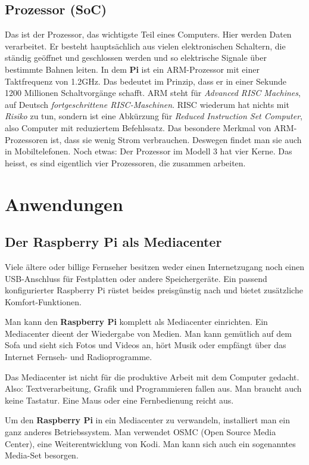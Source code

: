 \documentclass[12pt,a4paper]{article}
\newcommand{\rp}{\textbf{Raspberry Pi}\xspace}
\begin{document}
\subsection{Prozessor (SoC)}

Das ist der Prozessor, das wichtigste Teil eines Computers. Hier werden Daten verarbeitet. Er besteht hauptsächlich aus vielen elektronischen Schaltern, die ständig geöffnet und geschlossen werden und so elektrische Signale über bestimmte Bahnen leiten. In dem \textbf{Pi} ist ein ARM-Prozessor mit einer Taktfrequenz von 1.2GHz. Das bedeutet im Prinzip, dass er in einer Sekunde 1200 Millionen Schaltvorgänge schafft. ARM steht für \textit{Advanced RISC Machines}, auf Deutsch \textit{fortgeschrittene RISC-Maschinen}. RISC wiederum hat nichts mit \textit{Risiko} zu tun, sondern ist eine Abkürzung für \textit{Reduced Instruction Set Computer}, also Computer mit reduziertem Befehlssatz. Das besondere Merkmal von ARM-Prozessoren ist, dass sie wenig Strom verbrauchen. Deswegen findet man sie auch in Mobiltelefonen. Noch etwas: Der Prozessor im Modell 3 hat vier Kerne. Das heisst, es sind eigentlich vier Prozessoren, die zusammen arbeiten.  

\section{Anwendungen}

\subsection{Der \rp als Mediacenter}

Viele ältere oder billige Fernseher besitzen weder einen Internetzugang noch einen USB-Anschluss für Festplatten oder andere Speichergeräte. Ein passend konfigurierter Raspberry Pi rüstet beides preisgünstig nach und bietet zusätzliche Komfort-Funktionen.

Man kann den \rp komplett als Mediacenter einrichten. Ein Mediacenter dieent der Wiedergabe von Medien. Man kann gemütlich auf dem Sofa und sieht sich Fotos und Videos an, hört Musik oder empfängt über das Internet Fernseh- und Radioprogramme.

Das Mediacenter ist nicht für die produktive Arbeit mit dem Computer gedacht. Also: Textverarbeitung, Grafik und Programmieren fallen aus. Man braucht auch keine Tastatur. Eine Maus oder eine Fernbedienung reicht aus.

Um den \rp in ein Mediacenter zu verwandeln, installiert man ein ganz anderes Betriebssystem. Man verwendet OSMC (Open Source Media Center), eine Weiterentwicklung von Kodi. Man kann sich auch ein sogenanntes Media-Set besorgen.
\end{document}
